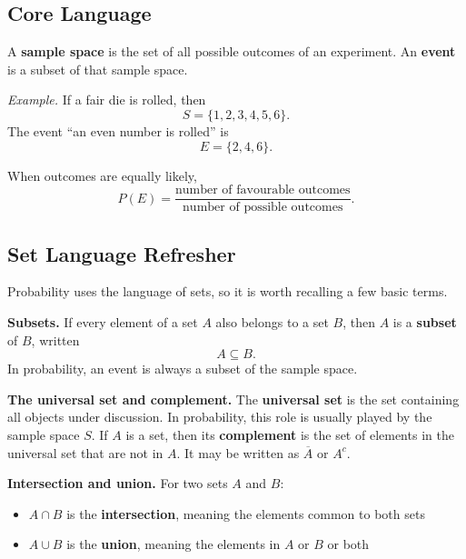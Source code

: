 \subsection{Core Language}

A \textbf{sample space} is the set of all possible outcomes of an experiment. An \textbf{event} is a subset of that sample space.

\textit{Example.} If a fair die is rolled, then
\[
S=\{1,2,3,4,5,6\}.
\]
The event ``an even number is rolled'' is
\[
E=\{2,4,6\}.
\]

When outcomes are equally likely,
\[
P(E)=\frac{\text{number of favourable outcomes}}{\text{number of possible outcomes}}.
\]

\subsection{Set Language Refresher}

Probability uses the language of sets, so it is worth recalling a few basic terms.

\textbf{Subsets.} If every element of a set $A$ also belongs to a set $B$, then $A$ is a \textbf{subset} of $B$, written
\[
A\subseteq B.
\]
In probability, an event is always a subset of the sample space.

\textbf{The universal set and complement.} The \textbf{universal set} is the set containing all objects under discussion. In probability, this role is usually played by the sample space $S$. If $A$ is a set, then its \textbf{complement} is the set of elements in the universal set that are not in $A$. It may be written as $\overline{A}$ or $A^c$.

\begin{center}
\end{center}

\textbf{Intersection and union.} For two sets $A$ and $B$:
\begin{itemize}[leftmargin=*]
  \item $A\cap B$ is the \textbf{intersection}, meaning the elements common to both sets
  \item $A\cup B$ is the \textbf{union}, meaning the elements in $A$ or $B$ or both
\end{itemize}

